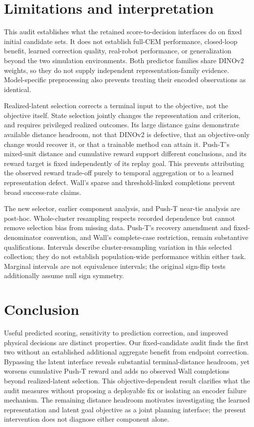 \documentclass{article}
\begin{document}
\section{Limitations and interpretation}

This audit establishes what the retained score-to-decision interfaces do on
fixed initial candidate sets. It does not establish full-CEM performance,
closed-loop benefit, learned correction quality, real-robot performance, or
generalization beyond the two simulation environments. Both predictor families
share DINOv2 weights, so they do not supply independent representation-family
evidence. Model-specific preprocessing also prevents treating their encoded
observations as identical.

Realized-latent selection corrects a terminal input to the objective, not the
objective itself. State selection jointly changes the representation and
criterion, and requires privileged realized outcomes. Its large distance gains
demonstrate available distance headroom, not that DINOv2 is defective, that an
objective-only change would recover it, or that a trainable method can attain
it. Push-T's mixed-unit distance and cumulative reward support different
conclusions, and its reward target is fixed independently of its replay goal. This prevents
attributing the observed reward trade-off purely to temporal aggregation or
to a learned representation defect. Wall's sparse and threshold-linked
completions prevent broad
success-rate claims.

The new selector, earlier component analysis, and Push-T near-tie analysis
are post-hoc. Whole-cluster resampling respects recorded dependence but cannot
remove selection bias from missing data. Push-T's recovery amendment and
fixed-denominator convention, and Wall's complete-case restriction, remain
substantive qualifications. Intervals describe cluster-resampling variation
in this selected collection; they do not establish population-wide performance
within either task. Marginal intervals are not equivalence intervals;
the original sign-flip tests additionally assume null sign symmetry.

\section{Conclusion}

Useful predicted scoring, sensitivity to prediction correction, and improved
physical decisions are distinct properties. Our fixed-candidate audit finds
the first two without an established additional aggregate benefit from
endpoint correction. Bypassing the latent interface reveals substantial
terminal-distance headroom, yet worsens cumulative Push-T reward and adds no
observed Wall completions beyond realized-latent selection. This objective-dependent result clarifies what the
audit measures without proposing a deployable fix or isolating an encoder
failure mechanism. The remaining distance headroom motivates investigating
the learned representation and latent goal objective as a joint planning
interface; the present intervention does not diagnose either component alone.
\end{document}
